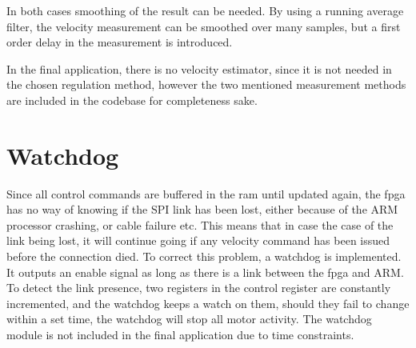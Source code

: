 In both cases smoothing of the result can be needed. By using a running average filter, the velocity measurement can be smoothed over many samples, but a first order delay in the measurement is introduced.

In the final application, there is no velocity estimator, since it is not needed in the chosen regulation method, however the two mentioned measurement methods are included in the codebase for completeness sake.


\section{Watchdog}
Since all control commands are buffered in the ram until updated again, the fpga has no way of knowing if the SPI link has been lost, either because of the ARM processor crashing, or cable failure etc. This means that in case the case of the link being lost, it will continue going if any velocity command has been issued before the connection died. To correct this problem, a watchdog is implemented. It outputs an enable signal as long as there is a link between the fpga and ARM. 
To detect the link presence, two registers in the control register are constantly incremented, and the watchdog keeps a watch on them, should they fail to change within a set time, the watchdog will stop all motor activity.
The watchdog module is not included in the final application due to time constraints.



























